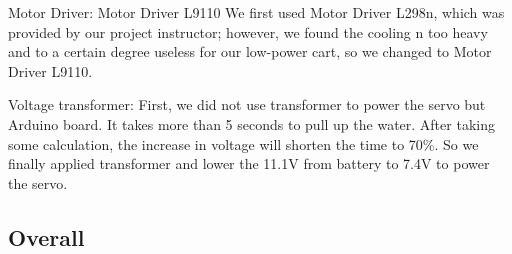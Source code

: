 Motor Driver: Motor Driver L9110 
We first used Motor Driver L298n, which was provided by our project instructor;
however, we found the cooling n too heavy and to a certain degree useless for
our low-power cart, so we changed to Motor Driver L9110.

Voltage transformer:
First, we did not use transformer to power the servo but Arduino board.
It takes more than 5 seconds to pull up the water.
After taking some calculation, the increase in voltage will shorten the time to
70\%.
So we finally applied transformer and lower the 11.1V from battery to 7.4V to
power the servo.

\subsection{Overall}